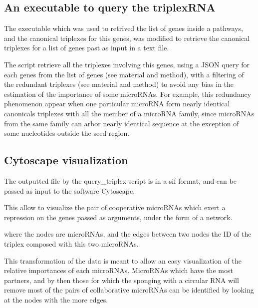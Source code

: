 \documentclass[a4paper,12pt]{report}
\begin{document}
\subsection{An executable to query the triplexRNA}

The executable which was used to retrived the list of genes inside a pathways, and the canonical triplexes for this genes, was modified to retrieve the canonical triplexes for a list of genes past as input in a text file.

The script retrieve all the triplexes involving this genes, using a JSON query for each genes from the list of genes (see material and method), with a filtering of the redundant triplexes (see material and method) to avoid any bias in the estimation of the importance of some microRNAs. For example, this redundancy phenomenon appear when one particular microRNA form nearly identical canonicals triplexes with all the member of a microRNA family, since microRNAs from the same family can arbor nearly identical sequence at the exception of some nucleotides outside the seed region. 


\subsection{Cytoscape visualization}

The outputted file by the query\_triplex script is in a sif format, and can be passed as input to the software Cytoscape\cite{cytoscape}.

This allow to visualize the pair of cooperative microRNAs which exert a repression on the genes passed as arguments, under the form of a network.

where the nodes are microRNAs, and the edges between two nodes the ID of the triplex composed with this two microRNAs. 

This transformation of the data is meant to allow an easy visualization of the relative importances of each microRNAs. MicroRNAs which have the most partners, and by then those for which the sponging with a circular RNA will remove most of the pairs of collaborative microRNAs can be identified by looking at the nodes with the more edges.
\end{document}

